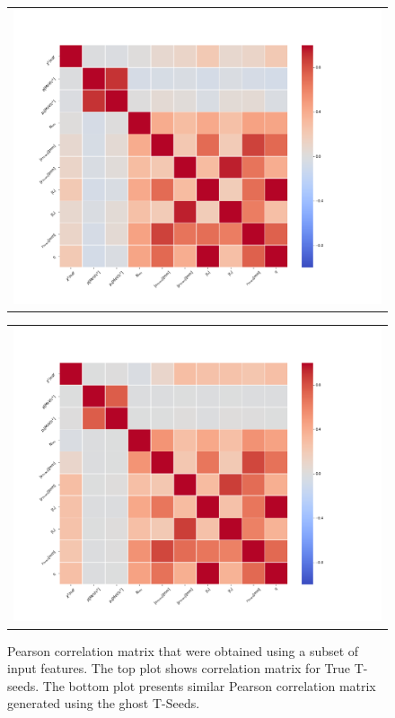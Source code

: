 \begin{figure}
  \centering
  \begin{tabular}{@{}c@{}}
    \includegraphics[width=\linewidth]{figures/corr_matrixTrue.png}
  \end{tabular}

  \vspace{\floatsep}

  \begin{tabular}{@{}c@{}}
    \includegraphics[width=\linewidth]{figures/corr_matrixFalse.png}
  \end{tabular}

  \caption{Pearson  correlation matrix that were obtained using a subset of input features. The top plot shows correlation matrix for True T-seeds. The bottom plot presents similar Pearson correlation matrix generated using the ghost T-Seeds.  
\label{fig:corrMatrix}}  
\end{figure}

